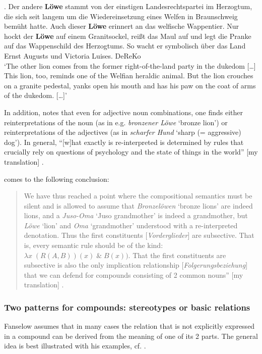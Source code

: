 \ex. \label{ex:loewe}
Der andere \textbf{Löwe} stammt von der einstigen Landesrechtspartei im Herzogtum, die
sich seit langem um die Wiedereinsetzung eines Welfen in Braunschweig bemüht
hatte. Auch dieser \textbf{Löwe} erinnert an das welfische Wappentier. Nur hockt der
\textbf{Löwe} auf einem Granitsockel, reißt das Maul auf und legt die Pranke auf das
Wappenschild des Herzogtums. So wacht er symbolisch über das Land Ernst
Augusts und Victoria Luises.  DeReKo
\\[0.4ex]
`The other {lion} comes from the former right-of-the-land party in the
dukedom [\dots] This {lion}, too, reminds one of the Welfian heraldic
animal. But the {lion} crouches on a granite pedestal, yanks open his
mouth and has his paw on the coat of arms of the dukedom. [\dots]'

In addition, \citet[145]{Fanselow:1981} notes that even for adjective noun
combinations, one finds either reinterpretations of the noun (as in
e.g. \emph{bronzener Löwe} `bronze lion') or reinterpretations of the adjectives (as in
\emph{scharfer Hund}  `sharp (= aggressive) dog'). In general, ``[w]hat exactly is re-interpreted is determined by rules that
  crucially rely on questions of psychology and the state of things in
  the world'' [my translation] \citep[147]{Fanselow:1981}.

\citeauthor{Fanselow:1981} comes to the following conclusion:
\begin{quotation}
We have thus reached a point where the compositional semantics
  must be silent and is allowed to assume that \emph{Bronzelöwen}
  `bronze lions' are indeed lions, and a \emph{Juso-Oma} `Juso grandmother' is indeed a
  grandmother, but \emph{Löwe} `lion' and \emph{Oma} `grandmother' understood with a
  re-interpreted denotation. Thus the first constituents [\emph{Vorderglieder}] are
  subsective. That is, every semantic rule should be of the kind:
  $\lambda x\; (R(A,B))(x)\; \&\; B(x))$. That the first constituents are subsective
  is also the only implication relationship [\emph{Folgerungsbeziehung}] that we can defend for
  compounds consisting of 2 common nouns'' [my translation] \citep[147]{Fanselow:1981}.
  \end{quotation} %
\subsubsection{Two patterns for compounds: stereotypes or basic relations}
\label{sec:fanselow:two-patterns}
Fanselow assumes that in many cases the relation that is not explicitly expressed in a
  compound can be derived from the meaning of one of its 2 parts. The
  general idea is best illustrated with his examples,
  cf. \Next.

